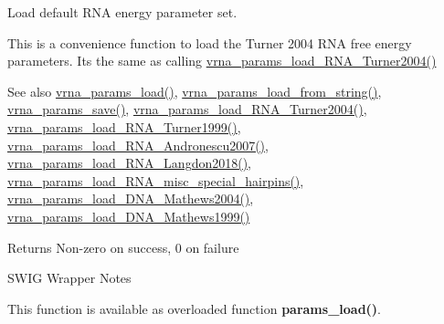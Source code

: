 Load default R\+NA energy parameter set. 

This is a convenience function to load the Turner 2004 R\+NA free energy parameters. It\textquotesingle{}s the same as calling \mbox{\hyperlink{group__energy__parameters__rw_ga7327fe66ef60c33ba80a87c04db0ee83}{vrna\+\_\+params\+\_\+load\+\_\+\+R\+N\+A\+\_\+\+Turner2004()}}

\begin{DoxySeeAlso}{See also}
\mbox{\hyperlink{group__energy__parameters__rw_gabb0583595c67094986ef90cb4f1c7555}{vrna\+\_\+params\+\_\+load()}}, \mbox{\hyperlink{group__energy__parameters__rw_gabcd9cc7040a6b633b56b1cbd6a14d68e}{vrna\+\_\+params\+\_\+load\+\_\+from\+\_\+string()}}, \mbox{\hyperlink{group__energy__parameters__rw_ga0de3731b3e4017c52bd678549f6c4ae5}{vrna\+\_\+params\+\_\+save()}}, \mbox{\hyperlink{group__energy__parameters__rw_ga7327fe66ef60c33ba80a87c04db0ee83}{vrna\+\_\+params\+\_\+load\+\_\+\+R\+N\+A\+\_\+\+Turner2004()}}, \mbox{\hyperlink{group__energy__parameters__rw_ga804393b6dfe06a2c6cae89219dffabb1}{vrna\+\_\+params\+\_\+load\+\_\+\+R\+N\+A\+\_\+\+Turner1999()}}, \mbox{\hyperlink{group__energy__parameters__rw_ga511a1c17c0fd10a1fbb0936674712ff8}{vrna\+\_\+params\+\_\+load\+\_\+\+R\+N\+A\+\_\+\+Andronescu2007()}}, \mbox{\hyperlink{group__energy__parameters__rw_ga3a87fe5e73eb906c0fa26f2c42c787fd}{vrna\+\_\+params\+\_\+load\+\_\+\+R\+N\+A\+\_\+\+Langdon2018()}}, \mbox{\hyperlink{group__energy__parameters__rw_ga00e07504d66dc24aca7befb4bdaa0db1}{vrna\+\_\+params\+\_\+load\+\_\+\+R\+N\+A\+\_\+misc\+\_\+special\+\_\+hairpins()}}, \mbox{\hyperlink{group__energy__parameters__rw_gafa45b5734355baa634ca0a2e2857563e}{vrna\+\_\+params\+\_\+load\+\_\+\+D\+N\+A\+\_\+\+Mathews2004()}}, \mbox{\hyperlink{group__energy__parameters__rw_ga4d897130a700f86b7d4035a95f25615a}{vrna\+\_\+params\+\_\+load\+\_\+\+D\+N\+A\+\_\+\+Mathews1999()}}
\end{DoxySeeAlso}
\begin{DoxyReturn}{Returns}
Non-\/zero on success, 0 on failure
\end{DoxyReturn}
\begin{DoxyRefDesc}{S\+W\+I\+G Wrapper Notes}
\item[\mbox{\hyperlink{wrappers__wrappers000101}{S\+W\+I\+G Wrapper Notes}}]This function is available as overloaded function {\bfseries{params\+\_\+load()}}. \end{DoxyRefDesc}
\mbox{\label{group__energy__parameters__rw_ga7327fe66ef60c33ba80a87c04db0ee83}} 
